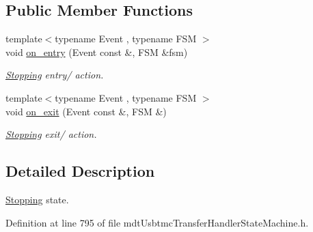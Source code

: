 \subsection*{Public Member Functions}
\begin{DoxyCompactItemize}
\item 
{\footnotesize template$<$typename Event , typename F\-S\-M $>$ }\\void \hyperlink{structmdt_usbtmc_transfer_handler_state_machine_1_1_state_machine___1_1_stopping_ab30cc6cb9f92e14a3d97461122cca7ed}{on\-\_\-entry} (Event const \&, F\-S\-M \&fsm)
\begin{DoxyCompactList}\small\item\em \hyperlink{structmdt_usbtmc_transfer_handler_state_machine_1_1_state_machine___1_1_stopping}{Stopping} entry/ action. \end{DoxyCompactList}\item 
{\footnotesize template$<$typename Event , typename F\-S\-M $>$ }\\void \hyperlink{structmdt_usbtmc_transfer_handler_state_machine_1_1_state_machine___1_1_stopping_a3a2448be358b7868cd4300cb05138188}{on\-\_\-exit} (Event const \&, F\-S\-M \&)
\begin{DoxyCompactList}\small\item\em \hyperlink{structmdt_usbtmc_transfer_handler_state_machine_1_1_state_machine___1_1_stopping}{Stopping} exit/ action. \end{DoxyCompactList}\end{DoxyCompactItemize}


\subsection{Detailed Description}
\hyperlink{structmdt_usbtmc_transfer_handler_state_machine_1_1_state_machine___1_1_stopping}{Stopping} state. 

Definition at line 795 of file mdt\-Usbtmc\-Transfer\-Handler\-State\-Machine.\-h.



